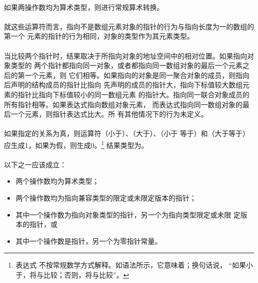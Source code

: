{\semantic
\paragraph{}
如果两操作数均为算术类型，则进行常规算术转换。

\paragraph{}
就这些运算符而言，指向不是数组元素对象的指针的行为与指向长度为一的数组的第一个
元素的指针的行为相同，对象的类型作为其元素类型。

\paragraph{}
当比较两个指针时，结果取决于所指向对象的地址空间中的相对位置。如果指向对象类型的
两个指针都指向同一对象，或者都指向同一数组对象的最后一个元素之后的第一个元素，则
它们相等。如果指向的对象是同一聚合对象的成员，则指向后声明的结构成员的指针比指向
先声明的成员的指针大，指向下标值较大数组元素的指针比指向下标值较小的同一数组元素
的指针大。指向同一联合对象成员的所有指针相等。如果表达式指向数组对象元素，
而表达式指向同一数组对象的最后一个元素，则指针表达式比大。所
有其他情况下的行为未定义。

\paragraph{}
如果指定的关系为真，则运算符\tm{\tl}（小于）、\tm{\tg}（大于）、\tm{\tl=}（小于
等于）和\tm{\tg=}（大于等于）应生成1，如果为假，则生成0。\footnote{表达式
不按常规数学方式解释。如语法所示，它意味着；换句话说，
``如果小于，将与比较；否则，将与比较''。}
结果类型为。

\syntax
\paragraph{}

\constraint
\paragraph{}
以下之一应该成立：
\begin{itemize}
  \item{两个操作数均为算术类型；}
  \item{两个操作数均为指向兼容类型的限定或未限定版本的指针；}
  \item{其中一个操作数为指向对象类型的指针，另一个为指向类型限定或未限
    定版本的指针，或}
  \item{其中一个操作数是指针，另一个为零指针常量。}
\end{itemize}

}
